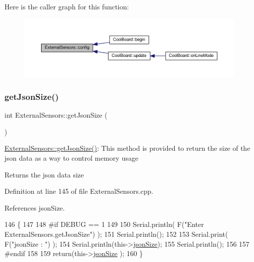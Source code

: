 Here is the caller graph for this function\+:\nopagebreak
\begin{figure}[H]
\begin{center}
\leavevmode
\includegraphics[width=350pt]{classExternalSensors_a862a4bd11346b37270d0244c2adabe5a_icgraph}
\end{center}
\end{figure}
\mbox{\label{classExternalSensors_a8e3a93efa8f5a0477f300e26084b6625}} 
\subsubsection{\texorpdfstring{get\+Json\+Size()}{getJsonSize()}}
{\footnotesize\ttfamily int External\+Sensors\+::get\+Json\+Size (\begin{DoxyParamCaption}{ }\end{DoxyParamCaption})}

\hyperlink{classExternalSensors_a8e3a93efa8f5a0477f300e26084b6625}{External\+Sensors\+::get\+Json\+Size()}\+: This method is provided to return the size of the json data as a way to control memory usage

\begin{DoxyReturn}{Returns}
the json data size 
\end{DoxyReturn}


Definition at line 145 of file External\+Sensors.\+cpp.



References json\+Size.


\begin{DoxyCode}
146 \{
147     
148 \textcolor{preprocessor}{#if DEBUG == 1}
149 
150     Serial.println( F(\textcolor{stringliteral}{"Enter ExternalSensors.getJsonSize"}) );
151     Serial.println();
152     
153     Serial.print( F(\textcolor{stringliteral}{"jsonSize : "}) );
154     Serial.println(this->\hyperlink{classExternalSensors_acacea86d74d967b57fcff282d26cff57}{jsonSize});
155     Serial.println();
156 
157 \textcolor{preprocessor}{#endif }
158 
159     \textcolor{keywordflow}{return}(this->\hyperlink{classExternalSensors_acacea86d74d967b57fcff282d26cff57}{jsonSize} );
160 \}
\end{DoxyCode}
\mbox{\label{classExternalSensors_a78c2bf55084435dd51d3c559b2d3c6f3}} 
